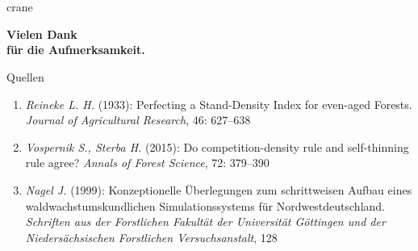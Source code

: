 \section*{}

\begin{frame}[plain]
  \begin{center}

    \begin{minipage}{0.75\textwidth}
      \begin{beamercolorbox}{crane}
        \begin{center}
          \vspace{1em}
          \textbf{\huge Vielen Dank}
          \\
          \textbf{\small für die Aufmerksamkeit.}
          \\
          \vspace{1em}
        \end{center}
      \end{beamercolorbox}
    \end{minipage}

    \hspace{0.017\textwidth}  %
    \begin{minipage}{0.725\textwidth}
      \begin{block}{Quellen}
        \begin{tiny}
          \begin{enumerate}
          \item \emph{Reineke L. H.} (1933): Perfecting a Stand-Density Index for even-aged Forests. \emph{Journal of Agricultural Research}, 46: 627--638
          \item \emph{Vospernik S., Sterba H.} (2015): Do competition-density rule and self-thinning rule agree? \emph{Annals of Forest Science}, 72: 379--390
          \item \emph{Nagel J.} (1999): Konzeptionelle Überlegungen zum schrittweisen Aufbau eines waldwachstumskundlichen Simulationssystems für Nordwestdeutschland. \emph{Schriften aus der Forstlichen Fakultät der Universität Göttingen und der Niedersächsischen Forstlichen Versuchsanstalt}, 128
          \end{enumerate}
        \end{tiny}
      \end{block}
    \end{minipage}
  \end{center}
\end{frame}

